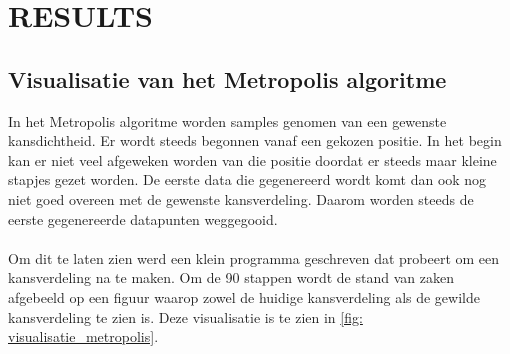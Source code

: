 \section{RESULTS}
\subsection{Visualisatie van het Metropolis algoritme}
In het Metropolis algoritme worden samples genomen van een gewenste kansdichtheid. Er wordt steeds begonnen vanaf een gekozen positie. In het begin kan er niet veel afgeweken worden van die positie doordat er steeds maar kleine stapjes gezet worden. De eerste data die gegenereerd wordt komt dan ook nog niet goed overeen met de gewenste kansverdeling. Daarom worden steeds de eerste gegenereerde datapunten weggegooid. \\ \\
Om dit te laten zien werd een klein programma geschreven dat probeert om een kansverdeling na te maken. Om de 90 stappen wordt de stand van zaken afgebeeld op een figuur waarop zowel de huidige kansverdeling als de gewilde kansverdeling te zien is. Deze visualisatie is te zien in \cref{fig: visualisatie_metropolis}.
